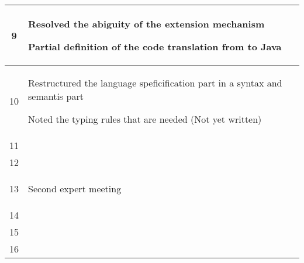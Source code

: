 \begin{center}
\begin{longtable}{|c|p{12cm}|}
9 & 
\begin{journal}
	\item Resolved the abiguity of the extension mechanism
	\item Partial definition of the code translation from \ooplss to Java
\end{journal}
\\ \hline
10 & 
\begin{journal}
	\item Restructured the language speficification part in a syntax and semantis part
	\item Noted the typing rules that are needed (Not yet written)
\end{journal}
\\ \hline
11 & 
\begin{journal}
	\item 
\end{journal}
\\ \hline
12 & 
\begin{journal}
	\item 
\end{journal}
\\ \hline
13 & 
\begin{journal}
	\item Second expert meeting
\end{journal}
\\ \hline
14 & 
\begin{journal}
	\item 
\end{journal}
\\ \hline
15 & 
\begin{journal}
	\item 
\end{journal}
\\ \hline
16 & 
\begin{journal}
	\item 
\end{journal}
\\ \hline
\end{longtable}
\end{center}

